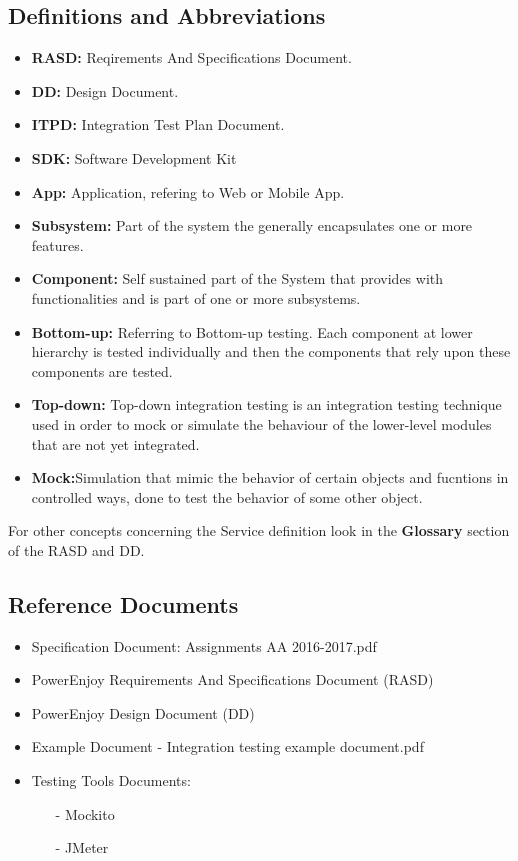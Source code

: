 \documentclass[a4paper]{article}
\begin{document}
\subsection{Definitions and Abbreviations}
\begin{itemize}
\item \textbf{RASD:} Reqirements And Specifications Document.
\item \textbf{DD:} Design Document.
\item \textbf{ITPD:} Integration Test Plan Document.
\item \textbf{SDK:} Software Development Kit
\item \textbf{App:} Application, refering to Web or Mobile App.
\item \textbf{Subsystem:} Part of the system the generally encapsulates one or more features.
\item \textbf{Component:} Self sustained part of the System that provides with functionalities and is part of one or more subsystems.
\item \textbf{Bottom-up:} Referring to Bottom-up testing. Each component at lower hierarchy is tested individually and then the components that rely upon these components are tested.
\item \textbf{Top-down:} Top-down integration testing is an integration testing technique used in order to mock or simulate the behaviour of the lower-level modules that are not yet integrated.
\item \textbf{Mock:}Simulation that mimic the behavior of certain objects and fucntions in controlled ways, done to test the behavior of some other object.
\end{itemize}
For other concepts concerning the Service definition look in the \textbf{Glossary} section of the RASD and DD.

\subsection{Reference Documents}
\begin{itemize}
\item Specification Document: Assignments AA 2016-2017.pdf
\item PowerEnjoy Requirements And Specifications Document (RASD)
\item PowerEnjoy Design Document (DD)
\item Example Document - Integration testing example document.pdf
\item Testing Tools Documents:
\begin{itemize}
\item[-] Mockito
\item[-] JMeter
\end{itemize}
\end{itemize}
\end{document}

